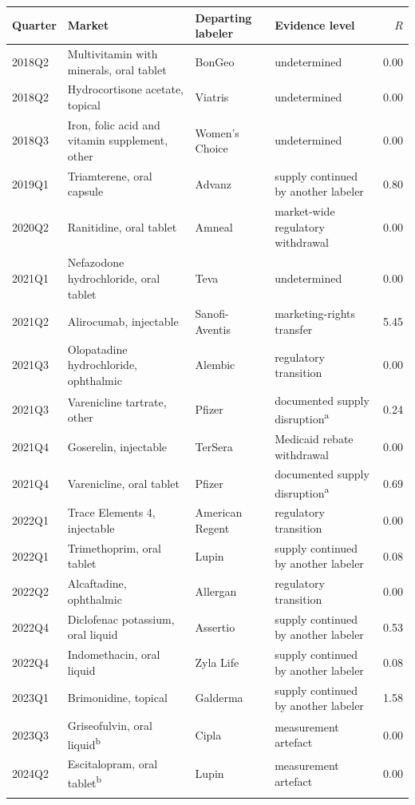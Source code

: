 \begin{tabular}{@{}lp{3.4cm}p{1.9cm}p{3.5cm}r@{}}
\toprule
Quarter & Market & Departing labeler & Evidence level & $R$ \\
\midrule
2018Q2 & Multivitamin with minerals, oral tablet & BonGeo & undetermined & 0.00 \\
2018Q2 & Hydrocortisone acetate, topical & Viatris & undetermined & 0.00 \\
2018Q3 & Iron, folic acid and vitamin supplement, other & Women's Choice & undetermined & 0.00 \\
2019Q1 & Triamterene, oral capsule & Advanz & supply continued by another labeler & 0.80 \\
2020Q2 & Ranitidine, oral tablet & Amneal & market-wide regulatory withdrawal & 0.00 \\
2021Q1 & Nefazodone hydrochloride, oral tablet & Teva & undetermined & 0.00 \\
2021Q2 & Alirocumab, injectable & Sanofi-Aventis & marketing-rights transfer & 5.45 \\
2021Q3 & Olopatadine hydrochloride, ophthalmic & Alembic & regulatory transition & 0.00 \\
2021Q3 & Varenicline tartrate, other & Pfizer & documented supply disruption\textsuperscript{a} & 0.24 \\
2021Q4 & Goserelin, injectable & TerSera & Medicaid rebate withdrawal & 0.00 \\
2021Q4 & Varenicline, oral tablet & Pfizer & documented supply disruption\textsuperscript{a} & 0.69 \\
2022Q1 & Trace Elements 4, injectable & American Regent & regulatory transition & 0.00 \\
2022Q1 & Trimethoprim, oral tablet & Lupin & supply continued by another labeler & 0.08 \\
2022Q2 & Alcaftadine, ophthalmic & Allergan & regulatory transition & 0.00 \\
2022Q4 & Diclofenac potassium, oral liquid & Assertio & supply continued by another labeler & 0.53 \\
2022Q4 & Indomethacin, oral liquid & Zyla Life & supply continued by another labeler & 0.08 \\
2023Q1 & Brimonidine, topical & Galderma & supply continued by another labeler & 1.58 \\
2023Q3 & Griseofulvin, oral liquid\textsuperscript{b} & Cipla & measurement artefact & 0.00 \\
2024Q2 & Escitalopram, oral tablet\textsuperscript{b} & Lupin & measurement artefact & 0.00 \\
\botrule
\end{tabular}
